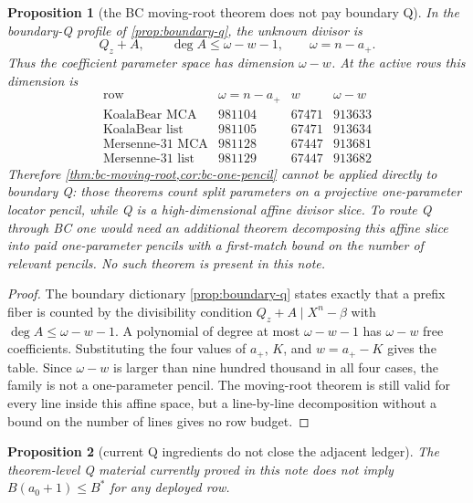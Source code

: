 \documentclass[a4paper,11pt]{amsart}
\newtheorem{proposition}[proposition]{Proposition}
\theoremstyle{remark}
\begin{document}
\begin{proposition}[the BC moving-root theorem does not pay boundary Q]\label{prop:bc-not-q}
In the boundary-Q profile of \cref{prop:boundary-q}, the unknown divisor is
\[
        Q_z+A,
        \qquad
        \deg A\le \omega-w-1,
        \qquad
        \omega=n-a_+ .
\]
Thus the coefficient parameter space has dimension \(\omega-w\).  At the active rows this dimension is
\[
\begin{array}{c|r|r|r}
\text{row} & \omega=n-a_+ & w & \omega-w\\
\hline
\text{KoalaBear MCA} & 981104 & 67471 & 913633\\
\text{KoalaBear list} & 981105 & 67471 & 913634\\
\text{Mersenne-31 MCA} & 981128 & 67447 & 913681\\
\text{Mersenne-31 list} & 981129 & 67447 & 913682
\end{array}
\]
Therefore \cref{thm:bc-moving-root,cor:bc-one-pencil} cannot be applied directly to boundary Q: those theorems count split parameters on a projective one-parameter locator pencil, while Q is a high-dimensional affine divisor slice.  To route Q through BC one would need an additional theorem decomposing this affine slice into paid one-parameter pencils with a first-match bound on the number of relevant pencils.  No such theorem is present in this note.
\end{proposition}

\begin{proof}
The boundary dictionary \cref{prop:boundary-q} states exactly that a prefix fiber is counted by the divisibility condition \(Q_z+A\mid X^n-\beta\) with \(\deg A\le\omega-w-1\).  A polynomial of degree at most \(\omega-w-1\) has \(\omega-w\) free coefficients.  Substituting the four values of \(a_+\), \(K\), and \(w=a_+-K\) gives the table.  Since \(\omega-w\) is larger than nine hundred thousand in all four cases, the family is not a one-parameter pencil.  The moving-root theorem is still valid for every line inside this affine space, but a line-by-line decomposition without a bound on the number of lines gives no row budget.
\end{proof}

\begin{proposition}[current Q ingredients do not close the adjacent ledger]\label{prop:q-not-closed}
The theorem-level Q material currently proved in this note does not imply \(B(a_0+1)\le B^*\) for any deployed row.
\end{proposition}
\end{document}
